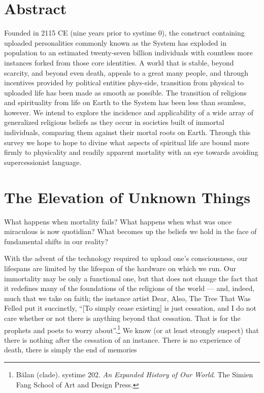 \hypertarget{abstract}{%
\section*{Abstract}\label{abstract}}

Founded in 2115 CE (nine years prior to systime 0), the construct containing uploaded personalities commonly known as the System has exploded in population to an estimated twenty-seven billion individuals with countless more instances forked from those core identities. A world that is stable, beyond scarcity, and beyond even death, appeals to a great many people, and through incentives provided by political entities phys-side, transition from physical to uploaded life has been made as smooth as possible. The transition of religions and spirituality from life on Earth to the System has been less than seamless, however. We intend to explore the incidence and applicability of a wide array of generalized religious beliefs as they occur in societies built of immortal individuals, comparing them against their mortal roots on Earth. Through this survey we hope to hope to divine what aspects of spiritual life are bound more firmly to physicality and readily apparent mortality with an eye towards avoiding supercessionist language.

\hypertarget{the-elevation-of-unknown-things}{%
\section*{The Elevation of Unknown Things}\label{the-elevation-of-unknown-things}}

What happens when mortality fails? What happens when what was once miraculous is now quotidian? What becomes up the beliefs we hold in the face of fundamental shifts in our reality?

With the advent of the technology required to upload one's consciousness, our lifespans are limited by the lifespan of the hardware on which we run. Our immortality may be only a functional one, but that does not change the fact that it redefines many of the foundations of the religions of the world --- and, indeed, much that we take on faith; the instance artist Dear, Also, The Tree That Was Felled put it succinctly, ``{[}To simply cease existing{]} is just cessation, and I do not care whether or not there is anything beyond that cessation. That is for the prophets and poets to worry about''.\footnote{Bălan (clade). systime 202. \emph{An Expanded History of Our World}. The Simien Fang School of Art and Design Press.} We know (or at least strongly suspect) that there is nothing after the cessation of an instance. There is no experience of death, there is simply the end of memories
